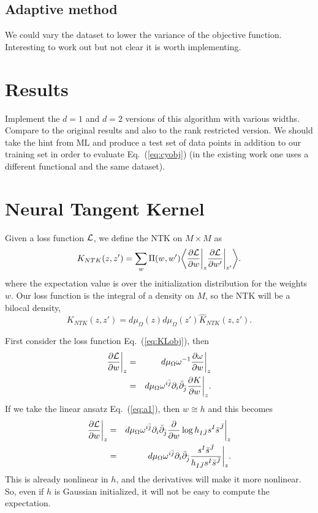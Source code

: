 \documentclass[12pt]{article}
\def\CL {{\cal L}}
\def\vev#1{\bigg\langle #1 \bigg\rangle}
\newcommand{\eq}[1]{Eq.~(\ref{eq:#1})}
\newcommand{\be}{\begin{equation}}
\newcommand{\ee}{\end{equation}}
\newcommand{\bea}{\begin{eqnarray}}
\newcommand{\eea}{\end{eqnarray}}
\def\bj{{\bar{j}}}
\def\bs{{\bar{s}}}
\def\bJ{{\bar{J}}}
\def\hK{{\hat K}}
\begin{document}
\subsection{ Adaptive method }

We could vary the dataset to lower the variance of the objective function.  Interesting to work out
but not clear it is worth implementing.

\section{ Results }

Implement the $d=1$ and $d=2$ versions of this algorithm with various widths.
Compare to the original results and also to the rank restricted version.
We should take the hint from ML and produce a test set of data points in addition to our training
set in order to evaluate \eq{cyobj} (in the existing work one uses a different functional and the same dataset).

\section{ Neural Tangent Kernel }

Given a loss function $\CL$, we define the NTK on $M\times M$ as
\be
K_{NTK}(z,z') = \sum_w \Pi(w,w') \vev{ \frac{\partial\CL}{\partial w}\bigg|_z \frac{\partial\CL}{\partial w'}\bigg|_{z'} }.
\ee
where the expectation value is over the initialization distribution for the weights $w$.
Our loss function is the integral of a density on $M$, so the NTK will be a bilocal density,
\be
K_{NTK}(z,z') = d\mu_\Omega(z) d\mu_\Omega(z') \hK_{NTK}(z,z') .
\ee


First consider the loss function \eq{KLobj}, then
\bea
\frac{\partial\CL}{\partial w}\bigg|_z &=& d\mu_\Omega \omega^{-1} \frac{\partial\omega}{\partial w}\bigg|_z \\
&=& d\mu_\Omega \omega^{i\bj} \partial_i \bar\partial_\bj \frac{\partial K}{\partial w}\bigg|_z .
\eea
If we take the linear ansatz \eq{a1}, then $w\cong h$ and this becomes
\bea \label{eq:Lgrad}
\frac{\partial\CL}{\partial w}\bigg|_z &=& d\mu_\Omega \omega^{i\bj} \partial_i \bar\partial_\bj 
\frac{\partial }{\partial w} \log h_{I\bJ} s^I \bs^\bJ  \bigg|_z \\
&=& d\mu_\Omega \omega^{i\bj} \partial_i \bar\partial_\bj 
\frac{s^I \bs^\bJ }{ h_{I\bJ} s^I \bs^\bJ }  \bigg|_z .
\eea
This is already nonlinear in $h$, and the derivatives will make it more nonlinear.
So, even if $h$ is Gaussian initialized, it will not be easy to compute the expectation.
\end{document}
